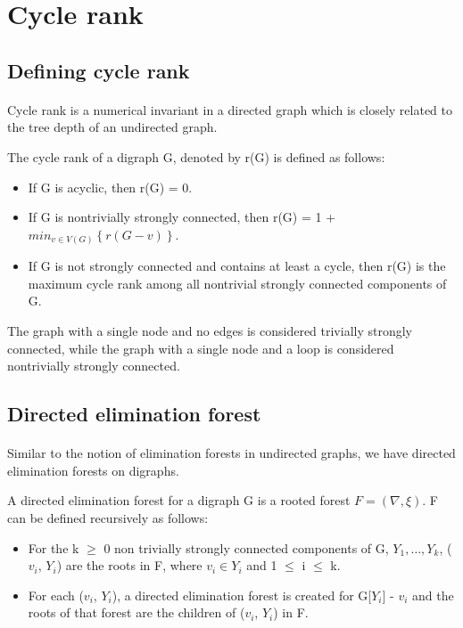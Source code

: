 \section{Cycle rank}

\subsection{Defining cycle rank}

\paragraph{}
Cycle rank is a numerical invariant in a directed graph which is closely related to the tree depth of an undirected graph.
\begin{definition}
The cycle rank of a digraph G, denoted by r(G) is defined as follows:

\begin{itemize} 
\item If G is acyclic, then r(G) = 0.
\item If G is nontrivially strongly connected, then r(G) = 1 + $min_{v \in V(G)} \left\{r(G-v)\right\}$.
\item If G is not strongly connected and contains at least a cycle, then r(G) is the maximum cycle rank among all nontrivial strongly connected components of G.
\end{itemize}

The graph with a single node and no edges is considered trivially strongly connected, while the graph with a single node and a loop is considered nontrivially strongly connected.

\end{definition}

\subsection{Directed elimination forest}

\paragraph{}
Similar to the notion of elimination forests in undirected graphs, we have directed elimination forests on digraphs.

\begin{definition}

A directed elimination forest for a digraph G is a rooted forest $F = (\nabla, \xi)$. F can be defined recursively as follows:

\begin{itemize}
\item For the k $\geq$ 0 non trivially strongly connected components of G, $Y_1, \ldots, Y_k$, ($v_i$, $Y_i$) are the roots in F, where $v_i \in Y_i$ and 1 $\leq$ i $\leq$ k.
\item For each ($v_i$, $Y_i$), a directed elimination forest is created for G[$Y_i$] - $v_i$ and the roots of that forest are the children of ($v_i$, $Y_i$) in F.
\end{itemize}
\label{definition:DET}
\end{definition}

